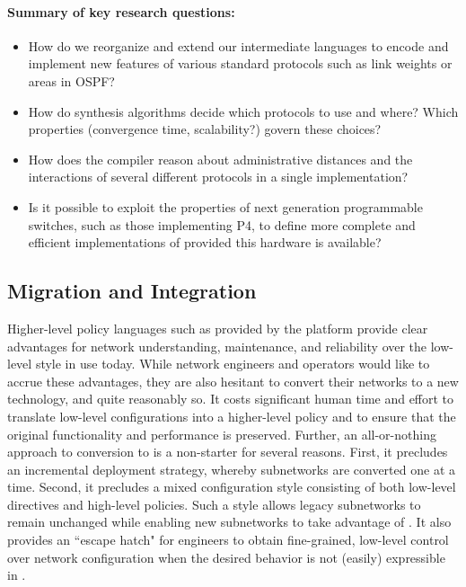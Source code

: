 \paragraph*{Summary of key research questions:}

\begin{itemize}
\item How do we reorganize and extend our intermediate languages to encode and
implement new features of various standard protocols such as link weights
or areas in OSPF?  
\item How do synthesis algorithms decide which protocols to use and where?
Which properties (convergence time, scalability?) govern these choices?
\item How does the compiler reason about administrative distances
and the interactions of several different protocols in a single
implementation?
\item Is it possible to exploit the properties of next generation
programmable switches, such as those implementing P4,
to define more complete and efficient implementations of \Name
provided this hardware is available?
\end{itemize}

\subsection{Migration and Integration}

Higher-level policy languages such as provided by the \Name platform provide clear advantages for network understanding, maintenance, and reliability over the low-level style in use today.  While network engineers and operators would like to accrue these advantages, they are also hesitant to convert their networks to a new technology, and quite reasonably so.  It costs significant human time and effort to translate low-level configurations into a higher-level policy and to ensure that the original functionality and performance is preserved.  Further, an all-or-nothing approach to conversion to \Name is a non-starter for several reasons.  First, it precludes an incremental deployment strategy, whereby subnetworks are converted one at a time.  Second, it precludes a mixed configuration style consisting of both low-level directives and high-level policies.  Such a style allows legacy subnetworks to remain unchanged while enabling new subnetworks to take advantage of \Name.  It also provides an ``escape hatch" for engineers to obtain fine-grained, low-level control over network configuration when the desired behavior is not (easily) expressible in \Name.  


